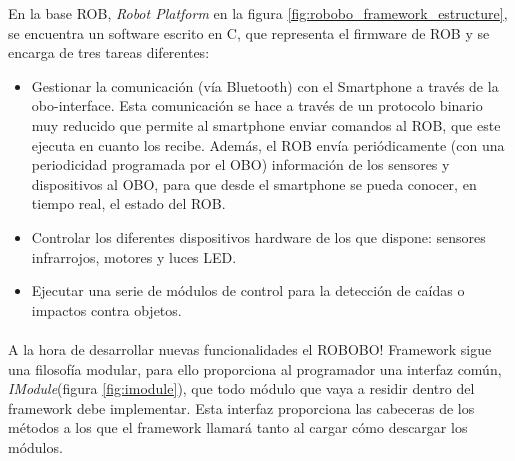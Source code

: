 En la base ROB, \textit{Robot Platform} en la figura \ref{fig:robobo_framework_estructure}, se encuentra un software escrito en C, que representa el firmware de ROB y se encarga de tres tareas diferentes:
\begin{itemize}
	\item Gestionar la comunicación (vía Bluetooth) con el Smartphone a través de la obo-interface. Esta comunicación se hace a través de un protocolo binario muy reducido que permite al smartphone enviar comandos al ROB, que este ejecuta en cuanto los recibe. Además, el ROB envía periódicamente (con una periodicidad programada por el OBO) información de los sensores y dispositivos al OBO, para que desde el smartphone se pueda conocer, en tiempo real, el estado del ROB. 
	\item Controlar los diferentes dispositivos hardware de los que dispone: sensores infrarrojos, motores y luces LED. 
	\item Ejecutar una serie de módulos de control para la detección de caídas o impactos contra objetos.

\end{itemize}









\paragraph*{ }
A la hora de desarrollar nuevas funcionalidades el ROBOBO! Framework sigue una filosofía modular, para ello proporciona al programador una interfaz común, \textit{IModule}(figura \ref{fig:imodule}), que todo módulo que vaya a residir dentro del framework debe implementar. Esta interfaz proporciona las cabeceras de los métodos a los que el framework llamará tanto al cargar cómo descargar los módulos.

